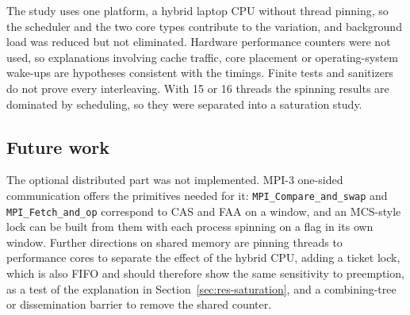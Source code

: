 The study uses one platform, a hybrid laptop CPU without thread pinning, so the scheduler and the two core types contribute to the variation, and background load was reduced but not eliminated. Hardware performance counters were not used, so explanations involving cache traffic, core placement or operating-system wake-ups are hypotheses consistent with the timings. Finite tests and sanitizers do not prove every interleaving. With 15 or 16 threads the spinning results are dominated by scheduling, so they were separated into a saturation study.

\subsection{Future work}\label{sec:future}

The optional distributed part\cite{r1} was not implemented. MPI-3 one-sided communication\cite{r7} offers the primitives needed for it: \texttt{MPI\_Compare\_and\_swap} and \texttt{MPI\_Fetch\_and\_op} correspond to CAS and FAA on a window, and an MCS-style lock can be built from them with each process spinning on a flag in its own window. Further directions on shared memory are pinning threads to performance cores to separate the effect of the hybrid CPU, adding a ticket lock, which is also FIFO and should therefore show the same sensitivity to preemption, as a test of the explanation in Section~\ref{sec:res-saturation}, and a combining-tree or dissemination barrier to remove the shared counter.

